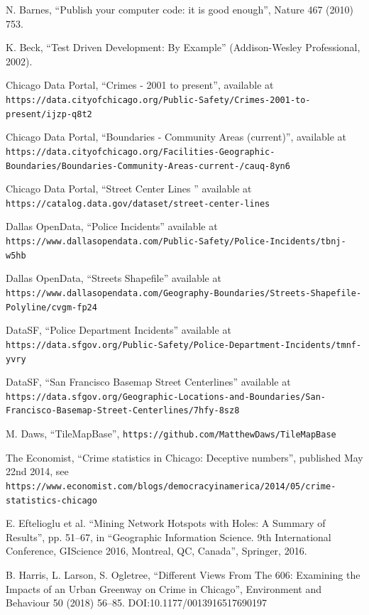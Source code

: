 \documentclass[twoside,a4paper,twocolumn,10pt]{article}
\theoremstyle{plain}
\theoremstyle{definition}
\begin{document}
\begin{thebibliography}{99}

 N. Barnes, ``Publish your computer code: it is good enough'',
  Nature 467 (2010) 753.

 K. Beck, ``Test Driven Development: By Example''
  (Addison-Wesley Professional, 2002).

 Chicago Data Portal, ``Crimes - 2001 to present'', available at
   \texttt{https://data.cityofchicago.org/Public-Safety/Crimes-2001-to-present/ijzp-q8t2}

 Chicago Data Portal, ``Boundaries - Community Areas (current)'', available at
    \texttt{https://data.cityofchicago.org/Facilities-Geographic-Boundaries/Boundaries-Community-Areas-current-/cauq-8yn6}

 Chicago Data Portal, ``Street Center Lines '' available at
    \texttt{https://catalog.data.gov/dataset/street-center-lines}

 Dallas OpenData, ``Police Incidents'' available at
    \texttt{https://www.dallasopendata.com/Public-Safety/Police-Incidents/tbnj-w5hb}

 Dallas OpenData, ``Streets Shapefile'' available at
    \texttt{https://www.dallasopendata.com/Geography-Boundaries/Streets-Shapefile-Polyline/cvgm-fp24}

 DataSF, ``Police Department Incidents'' available at
    \texttt{https://data.sfgov.org/Public-Safety/Police-Department-Incidents/tmnf-yvry}

 DataSF, ``San Francisco Basemap Street Centerlines'' available at
    \texttt{https://data.sfgov.org/Geographic-Locations-and-Boundaries/San-Francisco-Basemap-Street-Centerlines/7hfy-8sz8}

 M. Daws, ``TileMapBase'', \texttt{https://github.com/MatthewDaws/TileMapBase}

 The Economist, ``Crime statistics in Chicago: Deceptive numbers'', published
  May 22nd 2014, see \texttt{https://www.economist.com/blogs/democracyinamerica/2014/05/crime-statistics-chicago}

 E. Eftelioglu et al. ``Mining Network Hotspots with Holes: A Summary of Results'',
  pp. 51--67, in ``Geographic Information Science.  9th International Conference, GIScience 2016, Montreal, QC, Canada'',
  Springer, 2016.

 B. Harris, L. Larson, S. Ogletree,
  ``Different Views From The 606: Examining the Impacts of an Urban Greenway on Crime in Chicago'',
  Environment and Behaviour 50 (2018) 56--85.  DOI:10.1177/0013916517690197


\end{thebibliography}
\end{document}
